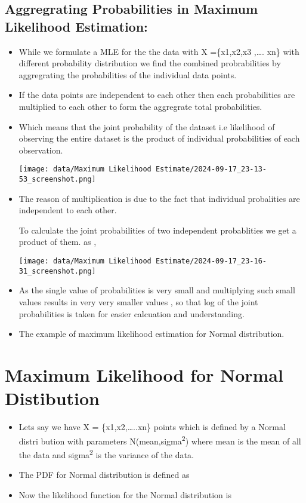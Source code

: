 \documentclass[11pt]{article}
\begin{document}
\subsection{Aggregrating Probabilities in Maximum Likelihood Estimation:}
\label{sec:org15a8599}

\begin{itemize}
\item While we formulate a MLE for the the data with X =\{x1,x2,x3 ,\ldots{}. xn\} with different
probability distribution  we find the combined probrabilities by aggregrating
the probabilities of the individual data points.

\item If the data points are independent to each other then each probabilities are
multiplied to each other to form the aggregrate total probabilities.
\item Which means that the joint probability of the dataset  i.e likelihood of observing
the entire dataset is the product of individual probabilities of each observation.

\begin{center}
\texttt{[image: data/Maximum Likelihood Estimate/2024-09-17\_23-13-53\_screenshot.png]}
\end{center}

\item The reason of multiplication is due to the fact that individual probalities are independent
to each other.

To calculate the joint probabilities of two independent probablities we get a product of them.
     as ,
\begin{center}
\texttt{[image: data/Maximum Likelihood Estimate/2024-09-17\_23-16-31\_screenshot.png]}
\end{center}
\item As the single value of probabilities is very small and multiplying such small values results
in very very smaller values , so that log of the joint probabilities is taken for
easier calcuation and understanding.

\item The example of maximum likelihood estimation for Normal distribution.
\end{itemize}
\section{Maximum Likelihood for Normal Distibution}
\label{sec:org37b6a64}
\begin{itemize}
\item Lets say we have X = \{x1,x2,\ldots{}..xn\} points which is defined by a Normal distri
bution with parameters N(mean,sigma\textsuperscript{2}) where mean is the mean of all the data
and sigma\textsuperscript{2} is the variance of the data.
\item The PDF for Normal distribution is defined as

\item Now the likelihood function for the Normal distribution is
\end{itemize}
\end{document}

